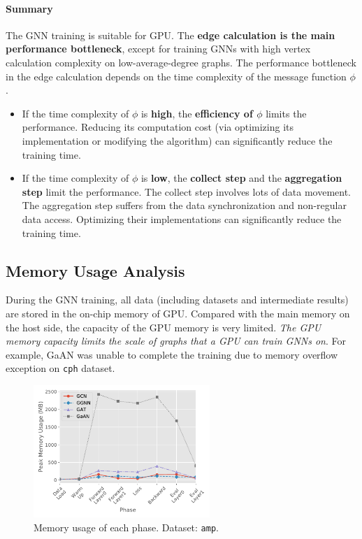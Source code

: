 \paragraph{Summary}
The GNN training is suitable for GPU.
The \textbf{edge calculation is the main performance bottleneck}, except for training GNNs with high vertex calculation complexity on low-average-degree graphs.
The performance bottleneck in the edge calculation depends on the time complexity of the message function $\phi$.
\begin{itemize}
    \item If the time complexity of $\phi$ is \textbf{high}, the \textbf{efficiency of $\phi$} limits the performance. Reducing its computation cost (via optimizing its implementation or modifying the algorithm) can significantly reduce the training time.
    \item If the time complexity of $\phi$ is \textbf{low}, the \textbf{collect step} and the \textbf{aggregation step} limit the performance. The collect step involves lots of data movement. The aggregation step suffers from the data synchronization and non-regular data access. Optimizing their implementations can significantly reduce the training time.
\end{itemize}

\subsection{Memory Usage Analysis}
\label{sec:memory_usage_analysis}

During the GNN training, all data (including datasets and intermediate results) are stored in the on-chip memory of GPU.
Compared with the main memory on the host side, the capacity of the GPU memory is very limited.
\emph{The GPU memory capacity limits the scale of graphs that a GPU can train GNNs on}.
For example, GaAN was unable to complete the training due to memory overflow exception on \texttt{cph} dataset.

\begin{figure}
    \centering
    \includegraphics[height=5cm]{figs/experiments/exp_memory_usage_stage_amp.pdf}
    \caption{Memory usage of each phase. Dataset: \texttt{amp}.}
    \label{fig:exp_memory_usage_stage_amp}
\end{figure}

